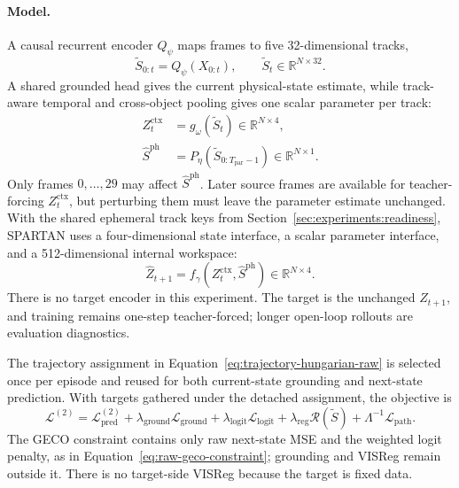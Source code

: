 \paragraph{Model.}
A causal recurrent encoder $Q_\psi$ maps frames to five 32-dimensional tracks,
\begin{equation}
    \widetilde S_{0:t}=Q_\psi(X_{0:t}),
    \qquad
    \widetilde S_t\in\mathbb{R}^{N\times32}.
\end{equation}
A shared grounded head gives the current physical-state estimate, while track-aware temporal and
cross-object pooling gives one scalar parameter per track:
\begin{align}
    Z_t^{\mathrm{ctx}} &=g_\omega(\widetilde S_t)\in\mathbb{R}^{N\times4},
    \\
    \widehat{S}^{\mathrm{ph}}
       &=P_\eta(\widetilde S_{0:T_{\mathrm{par}}-1})
         \in\mathbb{R}^{N\times1}.
    \label{eq:experiment-two-heads}
\end{align}
Only frames $0,\ldots,29$ may affect $\widehat S^{\mathrm{ph}}$.  Later source frames are
available for teacher-forcing $Z_t^{\mathrm{ctx}}$, but perturbing them must leave the parameter
estimate unchanged.  With the shared ephemeral track keys from
Section~\ref{sec:experiments:readiness}, SPARTAN uses a four-dimensional state interface, a scalar
parameter interface, and a 512-dimensional internal workspace:
\begin{equation}
    \widehat Z_{t+1}
      =f_\gamma(Z_t^{\mathrm{ctx}},\widehat S^{\mathrm{ph}})
      \in\mathbb{R}^{N\times4}.
    \label{eq:experiment-two-prediction}
\end{equation}
There is no target encoder in this experiment.  The target is the unchanged $Z_{t+1}$, and
training remains one-step teacher-forced; longer open-loop rollouts are evaluation diagnostics.

The trajectory assignment in Equation~\eqref{eq:trajectory-hungarian-raw} is selected once per
episode and reused for both current-state grounding and next-state prediction.  With targets
gathered under the detached assignment, the objective is
\begin{equation}
    \mathcal{L}^{(2)}
      =\mathcal{L}^{(2)}_{\mathrm{pred}}
       +\lambda_{\mathrm{ground}}\mathcal{L}_{\mathrm{ground}}
       +\lambda_{\mathrm{logit}}\mathcal{L}_{\mathrm{logit}}
       +\lambda_{\mathrm{reg}}\mathcal{R}(\widetilde S)
       +\Lambda^{-1}\mathcal{L}_{\mathrm{path}}.
    \label{eq:experiment-two-objective}
\end{equation}
The GECO constraint contains only raw next-state MSE and the weighted logit penalty, as in
Equation~\eqref{eq:raw-geco-constraint}; grounding and VISReg remain outside it.  There is no
target-side VISReg because the target is fixed data.


